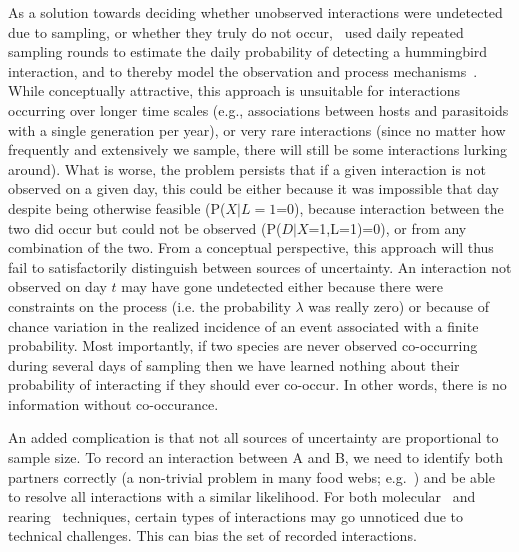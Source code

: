 ﻿\documentclass[12pt]{article}
\begin{document}
  As a solution towards deciding whether unobserved interactions were undetected due to sampling, or whether they truly do not occur,~\citet{Weinstein2017} used daily repeated sampling rounds to estimate the daily probability of detecting a hummingbird interaction, and to thereby model the observation and process mechanisms~\citep{Weinstein2017}. While conceptually attractive, this approach is unsuitable for interactions occurring over longer time scales (e.g., associations between hosts and parasitoids with a single generation per year), or very rare interactions (since no matter how frequently and extensively we sample, there will still be some interactions lurking around). What is worse, the problem persists that if a given interaction is not observed on a given day, this could be either because it was impossible that day despite being otherwise feasible (P($X|L=1$=0), because interaction between the two did occur but could not be observed (P($D|X$=1,L=1)=0), or from any combination of the two. From a conceptual perspective, this approach will thus fail to satisfactorily distinguish between sources of uncertainty. An interaction not observed on day $t$ may have gone undetected either because there were constraints on the process (i.e. the probability $\lambda$ was really zero) or because of chance variation in the realized incidence of an event associated with a finite probability. Most importantly, if two species are never observed co-occurring during several days of sampling then we have learned nothing about their probability of interacting if they should ever co-occur. In other words, there is no information without co-occurance.


  An added complication is that not all sources of uncertainty are proportional to sample size. To record an interaction between A and B, we need to identify both partners correctly (a non-trivial problem in many food webs; e.g.~\citet{Kaartinen2011,Roslin2016}) and be able to resolve all interactions with a similar likelihood. For both molecular~\citep{} and rearing~\citep{} techniques, certain types of interactions may go unnoticed due to technical challenges. This can bias the set of recorded interactions.
\end{document}
